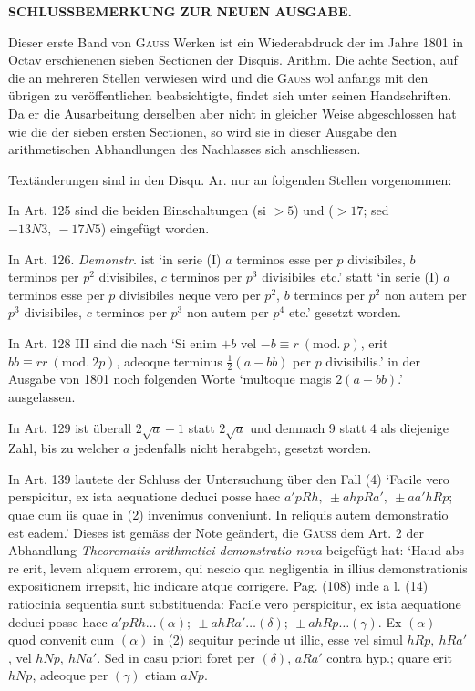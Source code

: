 \begin{center}\bfseries SCHLUSSBEMERKUNG ZUR NEUEN AUSGABE.\end{center}

Dieser erste Band von \textsc{Gauss} Werken ist ein Wiederabdruck der im Jahre 1801 in Octav erschienenen sieben Sectionen der Disquis. Arithm. Die achte Section, auf die an mehreren Stellen verwiesen wird und die \textsc{Gauss} wol anfangs mit den übrigen zu veröffentlichen beabsichtigte, findet sich unter seinen Handschriften. Da er die Ausarbeitung derselben aber nicht in gleicher Weise abgeschlossen hat wie die der sieben ersten Sectionen, so wird sie in dieser Ausgabe den arithmetischen Abhandlungen des Nachlasses sich anschliessen.

Textänderungen sind in den Disqu. Ar. nur an folgenden Stellen vorgenommen:

In Art. 125 sind die beiden Einschaltungen (si \(>5\)) und (\(>17\); sed \(-13N3,\allowbreak\ -17N5\)) eingefügt worden.

In Art. 126. \textit{Demonstr.} ist ‘in serie (I) \(a\) terminos esse per \(p\) divisibiles, \(b\) terminos per \(p^2\) divisibiles, \(c\) terminos per \(p^3\) divisibiles etc.’ statt ‘in serie (I) \(a\) terminos esse per \(p\) divisibiles neque vero per \(p^2\), \(b\) terminos per \(p^2\) non autem per \(p^3\) divisibiles, \(c\) terminos per \(p^3\) non autem per \(p^4\) etc.’ gesetzt worden.

In Art. 128 III sind die nach ‘Si enim \(+b\) vel \(-b\equiv r\ (\mathrm{mod.}\ p)\), erit \(bb\equiv rr\ (\mathrm{mod.}\ 2p)\), adeoque terminus \(\frac12(a-bb)\) per \(p\) divisibilis.’ in der Ausgabe von 1801 noch folgenden Worte ‘multoque magis \(2(a-bb)\).’ ausgelassen.

In Art. 129 ist überall \(2\surd a+1\) statt \(2\surd a\) und demnach 9 statt 4 als diejenige Zahl, bis zu welcher \(a\) jedenfalls nicht herabgeht, gesetzt worden.

In Art. 139 lautete der Schluss der Untersuchung über den Fall (4) ‘Facile vero perspicitur, ex ista aequatione deduci posse haec \(a'pRh,\allowbreak\ \pm ahpRa',\allowbreak\ \pm aa'hRp\); quae cum iis quae in (2) invenimus conveniunt. In reliquis autem demonstratio est eadem.’ Dieses ist gemäss der Note geändert, die \textsc{Gauss} dem Art. 2 der Abhandlung \textit{Theorematis arithmetici demonstratio nova} beigefügt hat: ‘Haud abs re erit, levem aliquem errorem, qui nescio qua negligentia in illius demonstrationis expositionem irrepsit, hic indicare atque corrigere. Pag. (108) inde a l. (14) ratiocinia sequentia sunt substituenda: Facile vero perspicitur, ex ista aequatione deduci posse haec \(a'pRh\ldots(\alpha);\allowbreak\ \pm ahRa'\ldots(\delta);\allowbreak\ \pm ahRp\ldots(\gamma)\). Ex \((\alpha)\) quod convenit cum \((\alpha)\) in (2) sequitur perinde ut illic, esse vel simul \(hRp,\allowbreak\ hRa'\), vel \(hNp,\allowbreak\ hNa'\). Sed in casu priori foret per \((\delta)\), \(aRa'\) contra hyp.; quare erit \(hNp\), adeoque per \((\gamma)\) etiam \(aNp\).

